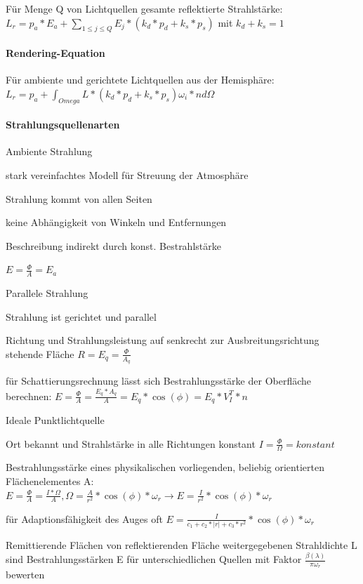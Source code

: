\documentclass[landscape]{article}
\begin{document}
\begin{multicols}{3}
  Für Menge Q von Lichtquellen gesamte reflektierte Strahlstärke: $L_r=p_a*E_a+\sum_{1\leq j \leq Q} E_j * (k_d*p_d + k_s*p_s)$ mit $k_d+k_s=1$
  
  \paragraph{Rendering-Equation}
  Für ambiente und gerichtete Lichtquellen aus der Hemisphäre: 
  $L_r=p_a + \int_{Omega} L*(k_d*p_d+k_s*p_s) \omega_i*n d\Omega$
  
  \paragraph{Strahlungsquellenarten}
  \begin{description*}
    \item[Ambiente Strahlung]
    \begin{itemize*}
      \item stark vereinfachtes Modell für Streuung der Atmosphäre
      \item Strahlung kommt von allen Seiten
      \item keine Abhängigkeit von Winkeln und Entfernungen
      \item Beschreibung indirekt durch konst. Bestrahlstärke
      \item $E=\frac{\Phi}{A}=E_a$
    \end{itemize*}
    \item[Parallele Strahlung]
    \begin{itemize*}
      \item Strahlung ist gerichtet und parallel
      \item Richtung und Strahlungsleistung auf senkrecht zur Ausbreitungsrichtung stehende Fläche $R=E_q=\frac{\Phi}{A_q}$
      \item für Schattierungsrechnung lässt sich Bestrahlungsstärke der Oberfläche berechnen: $E=\frac{\Phi}{A}=\frac{E_q*A_q}{A}=E_q*\cos(\phi) = E_q*V_I^T*n$
    \end{itemize*}
    \item[Ideale Punktlichtquelle]
    \begin{itemize*}
      \item Ort bekannt und Strahlstärke in alle Richtungen konstant $I=\frac{\Phi}{\Omega}=konstant$
      \item Bestrahlungsstärke eines physikalischen vorliegenden, beliebig orientierten Flächenelementes A: $E=\frac{\Phi}{A}=\frac{I*\Omega}{A}, \Omega=\frac{A}{r^2}*\cos(\phi)*\omega_r \rightarrow E=\frac{I}{r^2}*\cos(\phi)*\omega_r$
      \item für Adaptionsfähigkeit des Auges oft $E=\frac{I}{c_1+c_2*|r|+c_3*r^2}*\cos(\phi)*\omega_r$
    \end{itemize*}
    \item[Remittierende Flächen] von reflektierenden Fläche weitergegebenen Strahldichte L sind Bestrahlungsstärken E für unterschiedlichen Quellen mit Faktor $\frac{\beta(\lambda)}{\pi\omega_r}$ bewerten
  \end{description*}
  

\end{multicols}
\end{document}
